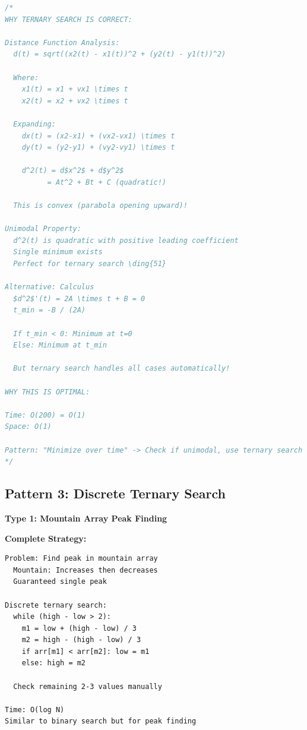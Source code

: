 \documentclass[11pt,a4paper,oneside]{book}
\begin{document}
\begin{lstlisting}[language=C++, caption=Complete Geometric Solutions - NEW PROBLEMS]
/*
WHY TERNARY SEARCH IS CORRECT:

Distance Function Analysis:
  d(t) = sqrt((x2(t) - x1(t))^2 + (y2(t) - y1(t))^2)
  
  Where:
    x1(t) = x1 + vx1 \times t
    x2(t) = x2 + vx2 \times t
  
  Expanding:
    dx(t) = (x2-x1) + (vx2-vx1) \times t
    dy(t) = (y2-y1) + (vy2-vy1) \times t
  
    d^2(t) = d$x^2$ + d$y^2$
          = At^2 + Bt + C (quadratic!)
  
  This is convex (parabola opening upward)!

Unimodal Property:
  d^2(t) is quadratic with positive leading coefficient
  Single minimum exists
  Perfect for ternary search \ding{51}

Alternative: Calculus
  $d^2$'(t) = 2A \times t + B = 0
  t_min = -B / (2A)
  
  If t_min < 0: Minimum at t=0
  Else: Minimum at t_min
  
  But ternary search handles all cases automatically!

WHY THIS IS OPTIMAL:

Time: O(200) = O(1)
Space: O(1)

Pattern: "Minimize over time" -> Check if unimodal, use ternary search
*/
\end{lstlisting}

\subsection{Pattern 3: Discrete Ternary Search}

\begin{tcolorbox}[
    enhanced,breakable,
    colback=warnyellow!10,
    colframe=warnyellow,
    boxrule=2pt,
    arc=4mm,
    title=\textbf{Complete Discrete Optimization Algorithms}
]
\textbf{Type 1: Mountain Array Peak Finding}

\textbf{Complete Strategy:}
\begin{verbatim}
Problem: Find peak in mountain array
  Mountain: Increases then decreases
  Guaranteed single peak
  
Discrete ternary search:
  while (high - low > 2):
    m1 = low + (high - low) / 3
    m2 = high - (high - low) / 3
    if arr[m1] < arr[m2]: low = m1
    else: high = m2
  
  Check remaining 2-3 values manually

Time: O(log N)
Similar to binary search but for peak finding
\end{verbatim}
\end{tcolorbox}
\end{document}
